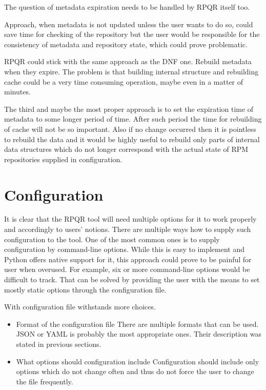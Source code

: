 The question of metadata expiration needs to be handled by RPQR itself too.

Approach, when metadata is not updated unless the user wants to do so, could save time for
checking of the repository but the user would be responsible for the consistency of metadata and repository
state, which could prove problematic.

RPQR could stick with the same approach as the DNF one. Rebuild metadata when they expire.
The problem is that building internal structure and rebuilding cache could be a very time consuming
operation, maybe even in a matter of minutes.

The third and maybe the most proper approach is to set the expiration time of metadata to some
longer period of time. After such period the time for rebuilding of cache will not be so important.
Also if no change occurred then it is pointless to rebuild the data and it would be highly useful
to rebuild only parts of internal data structures which do not longer correspond with the actual state
of RPM repositories supplied in configuration.

\section{Configuration}
It is clear that the RPQR tool will need multiple options for it to work properly and accordingly to
users' notions. There are multiple ways how to supply such configuration to the tool. One of the
most common ones is to supply configuration by command-line options. While this is easy to implement
and Python offers native support for it, this approach could prove to be painful for user when
overused. For example, six or more command-line options would be difficult to track. That can be solved
by providing the user with the means to set mostly static options through the configuration file.

With configuration file withstands more choices.
\begin{itemize}
  \item Format of the configuration file
        There are multiple formats that can be used. JSON or YAML is probably the most appropriate ones.
        Their description was stated in previous sections.
  \item What options should configuration include
        Configuration should include only options which do not change often and thus do not force
        the user to change the file frequently.
\end{itemize}

